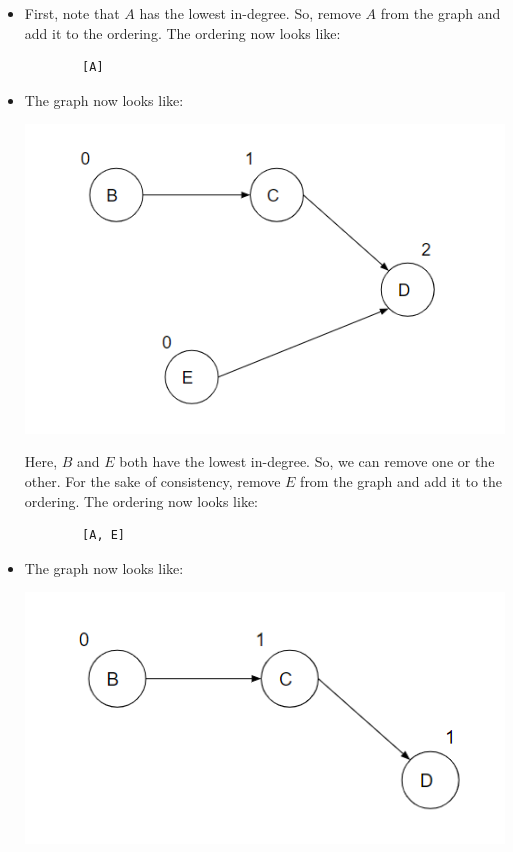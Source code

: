 \documentclass[letterpaper]{article}
\begin{document}
\begin{itemize}
    \item First, note that $A$ has the lowest in-degree. So, remove $A$ from the graph and add it to the ordering. The ordering now looks like: 
    \begin{verbatim}
        [A]
    \end{verbatim}
    \item The graph now looks like: 
    \begin{center}
        \includegraphics[scale=0.4]{assets/dag_ex_deg_2.png}
    \end{center}
    Here, $B$ and $E$ both have the lowest in-degree. So, we can remove one or the other. For the sake of consistency, remove $E$ from the graph and add it to the ordering. The ordering now looks like: 
    \begin{verbatim}
        [A, E]
    \end{verbatim}
    \item The graph now looks like:
    \begin{center}
        \includegraphics[scale=0.4]{assets/dag_ex_deg_3.png}

\end{center}
\end{itemize}
\end{document}
